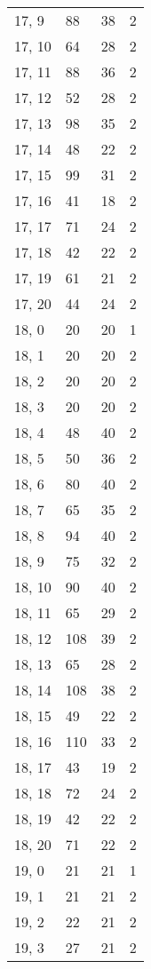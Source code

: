 \begin{table}
\begin{tabular}{llll}
17, 9  &   88 &   38 &     2 \\
17, 10 &   64 &   28 &     2 \\
17, 11 &   88 &   36 &     2 \\
17, 12 &   52 &   28 &     2 \\
17, 13 &   98 &   35 &     2 \\
17, 14 &   48 &   22 &     2 \\
17, 15 &   99 &   31 &     2 \\
17, 16 &   41 &   18 &     2 \\
17, 17 &   71 &   24 &     2 \\
17, 18 &   42 &   22 &     2 \\
17, 19 &   61 &   21 &     2 \\
17, 20 &   44 &   24 &     2 \\
18, 0  &   20 &   20 &     1 \\
18, 1  &   20 &   20 &     2 \\
18, 2  &   20 &   20 &     2 \\
18, 3  &   20 &   20 &     2 \\
18, 4  &   48 &   40 &     2 \\
18, 5  &   50 &   36 &     2 \\
18, 6  &   80 &   40 &     2 \\
18, 7  &   65 &   35 &     2 \\
18, 8  &   94 &   40 &     2 \\
18, 9  &   75 &   32 &     2 \\
18, 10 &   90 &   40 &     2 \\
18, 11 &   65 &   29 &     2 \\
18, 12 &  108 &   39 &     2 \\
18, 13 &   65 &   28 &     2 \\
18, 14 &  108 &   38 &     2 \\
18, 15 &   49 &   22 &     2 \\
18, 16 &  110 &   33 &     2 \\
18, 17 &   43 &   19 &     2 \\
18, 18 &   72 &   24 &     2 \\
18, 19 &   42 &   22 &     2 \\
18, 20 &   71 &   22 &     2 \\
19, 0  &   21 &   21 &     1 \\
19, 1  &   21 &   21 &     2 \\
19, 2  &   22 &   21 &     2 \\
19, 3  &   27 &   21 &     2 \\

\end{tabular}
\end{table}

